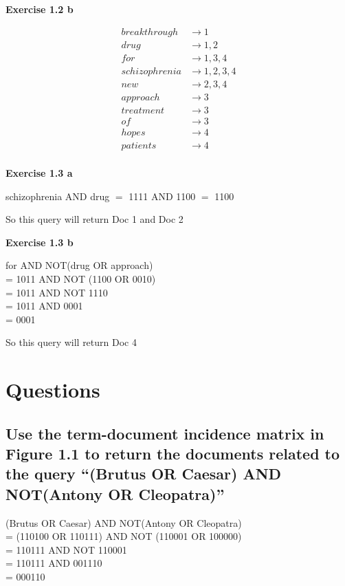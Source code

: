 \documentclass[11pt]{article} %
\begin{document}
\noindent\textbf{Exercise 1.2 b}

\begin{align*}
    breakthrough &\rightarrow 1\\
    drug &\rightarrow 1, 2\\
    for &\rightarrow 1, 3, 4\\
    schizophrenia &\rightarrow 1, 2, 3, 4\\
    new &\rightarrow 2, 3, 4\\
    approach &\rightarrow 3\\
    treatment &\rightarrow 3\\
    of &\rightarrow 3\\
    hopes &\rightarrow 4\\
    patients &\rightarrow 4\\
\end{align*}

\noindent\textbf{Exercise 1.3 a}

\noindent schizophrenia AND drug $=$ 1111 AND 1100 $=$ 1100

So this query will return Doc 1 and Doc 2

\noindent\textbf{Exercise 1.3 b}

\noindent for AND NOT(drug OR approach)\\
= 1011 AND NOT (1100 OR 0010)\\
= 1011 AND NOT 1110\\
= 1011 AND 0001\\
= 0001

So this query will return Doc 4

\section{Questions}

\subsection{Use the term-document incidence matrix in Figure 1.1 to return the documents related to the query ``(Brutus OR Caesar) AND NOT(Antony OR Cleopatra)''}

\noindent (Brutus OR Caesar) AND NOT(Antony OR Cleopatra)\\
= (110100 OR 110111) AND NOT (110001 OR 100000)\\
= 110111 AND NOT 110001\\
= 110111 AND 001110\\
= 000110
\end{document}

